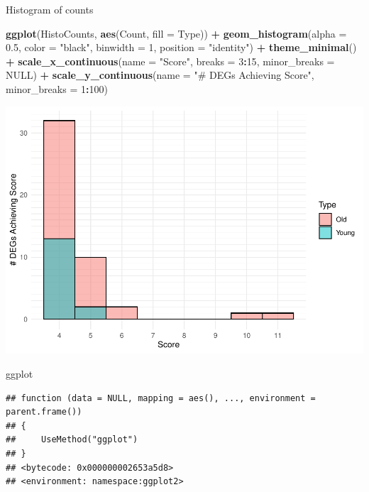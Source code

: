\documentclass[
]{article}
\newenvironment{Shaded}{\begin{snugshade}}{\end{snugshade}}
\newcommand{\DataTypeTok}[1]{\textcolor[rgb]{0.13,0.29,0.53}{#1}}
\newcommand{\DecValTok}[1]{\textcolor[rgb]{0.00,0.00,0.81}{#1}}
\newcommand{\FloatTok}[1]{\textcolor[rgb]{0.00,0.00,0.81}{#1}}
\newcommand{\KeywordTok}[1]{\textcolor[rgb]{0.13,0.29,0.53}{\textbf{#1}}}
\newcommand{\NormalTok}[1]{#1}
\newcommand{\OperatorTok}[1]{\textcolor[rgb]{0.81,0.36,0.00}{\textbf{#1}}}
\newcommand{\OtherTok}[1]{\textcolor[rgb]{0.56,0.35,0.01}{#1}}
\newcommand{\StringTok}[1]{\textcolor[rgb]{0.31,0.60,0.02}{#1}}
\begin{document}
Histogram of counts

\begin{Shaded}
\begin{Highlighting}[]
\KeywordTok{ggplot}\NormalTok{(HistoCounts, }\KeywordTok{aes}\NormalTok{(Count, }\DataTypeTok{fill =}\NormalTok{ Type)) }\OperatorTok{+}
\StringTok{  }\KeywordTok{geom_histogram}\NormalTok{(}\DataTypeTok{alpha =} \FloatTok{0.5}\NormalTok{, }\DataTypeTok{color =} \StringTok{"black"}\NormalTok{, }\DataTypeTok{binwidth =} \DecValTok{1}\NormalTok{, }\DataTypeTok{position =} \StringTok{"identity"}\NormalTok{) }\OperatorTok{+}
\StringTok{  }\KeywordTok{theme_minimal}\NormalTok{() }\OperatorTok{+}
\StringTok{  }\KeywordTok{scale_x_continuous}\NormalTok{(}\DataTypeTok{name =} \StringTok{"Score"}\NormalTok{, }\DataTypeTok{breaks =} \DecValTok{3}\OperatorTok{:}\DecValTok{15}\NormalTok{, }\DataTypeTok{minor_breaks =} \OtherTok{NULL}\NormalTok{) }\OperatorTok{+}
\StringTok{  }\KeywordTok{scale_y_continuous}\NormalTok{(}\DataTypeTok{name =} \StringTok{"# DEGs Achieving Score"}\NormalTok{, }\DataTypeTok{minor_breaks =} \DecValTok{1}\OperatorTok{:}\DecValTok{100}\NormalTok{)}
\end{Highlighting}
\end{Shaded}

\includegraphics{Thesis_DualCodeTest_files/figure-latex/unnamed-chunk-34-1.pdf}

\begin{Shaded}
\begin{Highlighting}[]
\NormalTok{ggplot}
\end{Highlighting}
\end{Shaded}

\begin{verbatim}
## function (data = NULL, mapping = aes(), ..., environment = parent.frame()) 
## {
##     UseMethod("ggplot")
## }
## <bytecode: 0x000000002653a5d8>
## <environment: namespace:ggplot2>
\end{verbatim}
\end{document}
